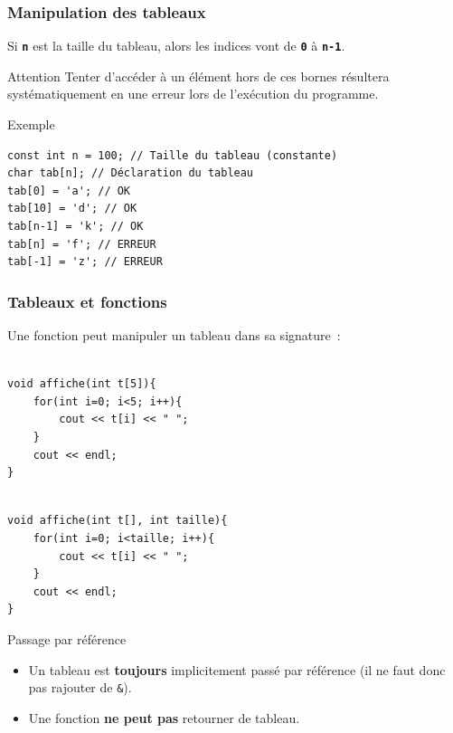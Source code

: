 \begin{frame}[fragile=singleslide]
	\frametitle{Manipulation des tableaux}
	Si \texttt{\textbf{n}} est la taille du tableau, alors les indices vont de \texttt{\textbf{0}} à \texttt{\textbf{n-1}}.
    
    \begin{alertblock}{Attention}
    Tenter d'accéder à un élément hors de ces bornes résultera systématiquement en une erreur lors de l'exécution du programme.
    \end{alertblock}
	
    \begin{exampleblock}{Exemple}
	\begin{verbatim}
const int n = 100; // Taille du tableau (constante)
char tab[n]; // Déclaration du tableau
tab[0] = 'a'; // OK
tab[10] = 'd'; // OK
tab[n-1] = 'k'; // OK
tab[n] = 'f'; // ERREUR
tab[-1] = 'z'; // ERREUR
	\end{verbatim}
    \end{exampleblock}
\end{frame}

\begin{frame}[fragile=singleslide]
\frametitle{Tableaux et fonctions}

Une fonction peut manipuler un tableau dans sa signature~:

\begin{minipage}{0.47\linewidth}
\begin{verbatim}

void affiche(int t[5]){
    for(int i=0; i<5; i++){
    	cout << t[i] << " ";
    }
    cout << endl;
}

\end{verbatim}
\end{minipage}
\hfill
\begin{minipage}{0.52\linewidth}
\begin{verbatim}

void affiche(int t[], int taille){
    for(int i=0; i<taille; i++){
    	cout << t[i] << " ";
    }
    cout << endl;
}

\end{verbatim}
\end{minipage}

\begin{alertblock}{Passage par référence}
\begin{itemize}
\item Un tableau est \textbf{toujours} implicitement passé par référence (il ne faut donc pas rajouter de \texttt{\&}).
\item Une fonction \textbf{ne peut pas} retourner de tableau.
\end{itemize}
\end{alertblock}
\end{frame}

